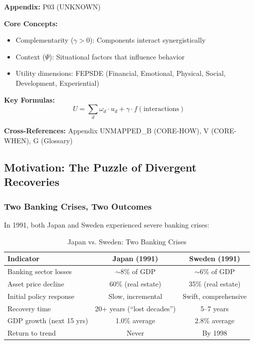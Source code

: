 \begin{tcolorbox}[colback=blue!5!white, colframe=blue!75!black,
    title=Quick Reference: Unknown]

\textbf{Appendix:} P03 (UNKNOWN)

\textbf{Core Concepts:}
\begin{itemize}[nosep]
\item Complementarity ($\gamma > 0$): Components interact synergistically
\item Context ($\Psi$): Situational factors that influence behavior
\item Utility dimensions: FEPSDE (Financial, Emotional, Physical, Social, Development, Experiential)
\end{itemize}

\textbf{Key Formulas:}
\begin{equation}
U = \sum_d \omega_d \cdot u_d + \gamma \cdot f(\text{interactions})
\end{equation}

\textbf{Cross-References:} Appendix UNMAPPED_B (CORE-HOW), V (CORE-WHEN), G (Glossary)
\end{tcolorbox}

\subsection{Motivation: The Puzzle of Divergent Recoveries}

\subsubsection{Two Banking Crises, Two Outcomes}

In 1991, both Japan and Sweden experienced severe banking crises:

\begin{table}[htbp]
\centering
\caption{Japan vs. Sweden: Two Banking Crises}
\label{tab:japan-sweden}
\begin{tabular}{@{}lcc@{}}
\toprule
\textbf{Indicator} & \textbf{Japan (1991)} & \textbf{Sweden (1991)} \\
\midrule
Banking sector losses & $\sim$8\% of GDP & $\sim$6\% of GDP \\
Asset price decline & 60\% (real estate) & 35\% (real estate) \\
Initial policy response & Slow, incremental & Swift, comprehensive \\
\midrule
Recovery time & 20+ years (``lost decades'') & 5--7 years \\
GDP growth (next 15 yrs) & 1.0\% average & 2.8\% average \\
Return to trend & Never & By 1998 \\
\bottomrule
\end{tabular}
\end{table}

